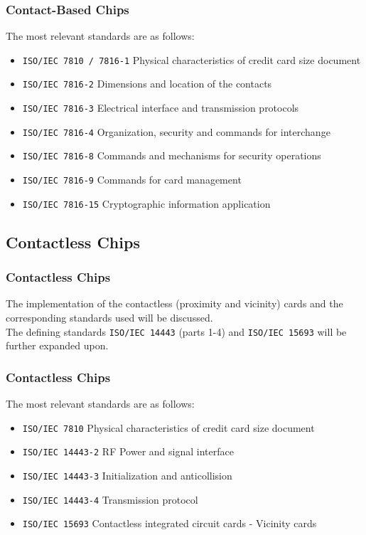 \documentclass{beamer}
\begin{document}
	\begin{frame}
		\frametitle{Contact-Based Chips}
		The most relevant standards are as follows:
		\begin{itemize}
			\item \texttt{ISO/IEC 7810 / 7816-1} Physical characteristics of credit
			card size document
			\item \texttt{ISO/IEC 7816-2} Dimensions and location of the contacts
			\item \texttt{ISO/IEC 7816-3} Electrical interface and transmission protocols
			\item \texttt{ISO/IEC 7816-4} Organization, security and commands for interchange
			\item \texttt{ISO/IEC 7816-8} Commands and mechanisms for security operations 
			\item \texttt{ISO/IEC 7816-9} Commands for card management
			\item \texttt{ISO/IEC 7816-15} Cryptographic information application
		\end{itemize}
	\end{frame}
	
	\subsection{Contactless Chips}
	\begin{frame}
		\frametitle{Contactless Chips}
		The implementation of the contactless (proximity and vicinity) cards and the corresponding standards used will be discussed.\\
		The defining standards \texttt{ISO/IEC 14443} (parts 1-4) and  \texttt{ISO/IEC 15693} will be further expanded upon. 
	\end{frame}
	
	\begin{frame}
		\frametitle{Contactless Chips}
		The most relevant standards are as follows:
		\begin{itemize}
			\item \texttt{ISO/IEC 7810} Physical characteristics of credit
			card size document
			\item \texttt{ISO/IEC 14443-2} RF Power and signal interface
			\item \texttt{ISO/IEC 14443-3} Initialization and anticollision
			\item \texttt{ISO/IEC 14443-4} Transmission protocol
			\item \texttt{ISO/IEC 15693} Contactless integrated circuit cards - Vicinity cards
		\end{itemize}
	\end{frame}
\end{document}
